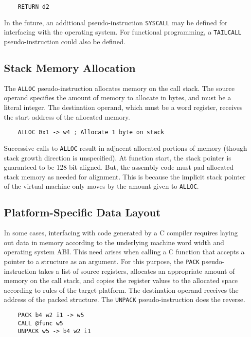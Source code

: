 \begin{verbatim}
    RETURN d2
\end{verbatim}

In the future, an additional pseudo-instruction \texttt{SYSCALL}
may be defined for interfacing with the operating system.
For functional programming, a \texttt{TAILCALL} pseudo-instruction
could also be defined.

\subsection{Stack Memory Allocation}

The \texttt{ALLOC} pseudo-instruction allocates memory
on the call stack. The source operand
specifies the amount of memory to allocate in bytes,
and must be a literal integer. The destination operand, which must
be a word register, receives the start address of the
allocated memory.

\begin{verbatim}
    ALLOC 0x1 -> w4 ; Allocate 1 byte on stack
\end{verbatim}

Successive calls to \texttt{ALLOC} result in adjacent
allocated portions of memory (though stack growth direction
is unspecified). At function start, the stack pointer
is guaranteed to be 128-bit aligned. But, the assembly
code must pad allocated stack memory as needed for alignment.
This is because the implicit stack pointer of
the virtual machine only moves by the amount given to \texttt{ALLOC}.

\subsection{Platform-Specific Data Layout}

In some cases, interfacing with code generated by a C compiler
requires laying out data in memory according to the
underlying machine word width and operating system ABI.
This need arises when calling a C function that accepts
a pointer to a structure as an argument.
For this purpose, the \texttt{PACK} pseudo-instruction takes a list
of source registers, allocates an appropriate amount of memory
on the call stack, and copies the register values to the allocated
space according to rules of the target platform. The destination
operand receives the address of the packed structure.
The \texttt{UNPACK} pseudo-instruction does the reverse.

\begin{verbatim}
    PACK b4 w2 i1 -> w5
    CALL @func w5
    UNPACK w5 -> b4 w2 i1
\end{verbatim}
